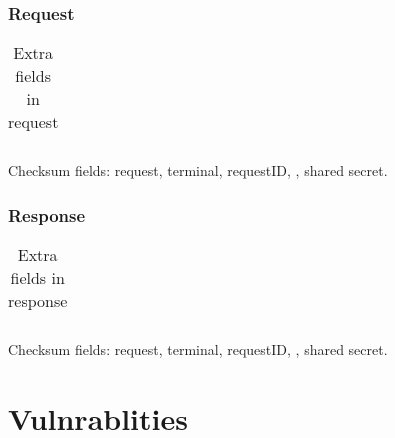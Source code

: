 \documentclass[a4paper,11pt]{article}
\newcommand{\code}[1]
   {\textsf{#1}}
\begin{document}
\subsubsection{Request}
\begin{table}[!h]
  \begin{tabular}{|l|l|}
    \hline
       \\\hline
  \end{tabular} 
  \caption{Extra fields in \code{} request}
\end{table}

Checksum fields: request, terminal, requestID, , shared secret.

\subsubsection{Response}
\begin{table}[!h]
  \begin{tabular}{|l|l|}
    \hline
       \\\hline
  \end{tabular} 
  \caption{Extra fields in \code{} response}
\end{table}

Checksum fields: request, terminal, requestID, , shared secret.



\section{Vulnrablities}
\end{document}
